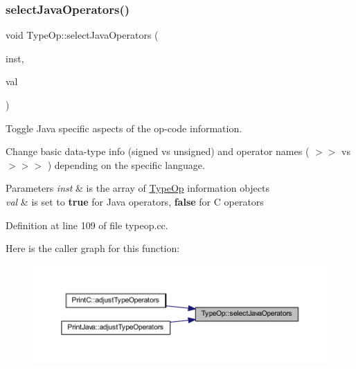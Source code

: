 \subsubsection{\texorpdfstring{selectJavaOperators()}{selectJavaOperators()}}
{\footnotesize\ttfamily void Type\+Op\+::select\+Java\+Operators (\begin{DoxyParamCaption}\item[{vector$<$ \mbox{\hyperlink{class_type_op}{Type\+Op}} $\ast$ $>$ \&}]{inst,  }\item[{bool}]{val }\end{DoxyParamCaption})\hspace{0.3cm}{\ttfamily [static]}}



Toggle Java specific aspects of the op-\/code information. 

Change basic data-\/type info (signed vs unsigned) and operator names ( \textquotesingle{}$>$$>$\textquotesingle{} vs \textquotesingle{}$>$$>$$>$\textquotesingle{} ) depending on the specific language. 
\begin{DoxyParams}{Parameters}
{\em inst} & is the array of \mbox{\hyperlink{class_type_op}{Type\+Op}} information objects \\
\hline
{\em val} & is set to {\bfseries{true}} for Java operators, {\bfseries{false}} for C operators \\
\hline
\end{DoxyParams}


Definition at line 109 of file typeop.\+cc.

Here is the caller graph for this function\+:
\nopagebreak
\begin{figure}[H]
\begin{center}
\leavevmode
\includegraphics[width=350pt]{class_type_op_a518700fe96d7e215d8c42d6049626c88_icgraph}
\end{center}
\end{figure}
\mbox{\label{class_type_op_a7b37f5313e117f939f6769e130af5865}} 
